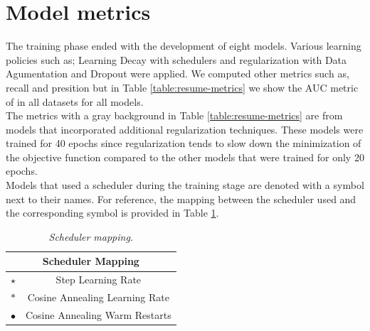\section{Model metrics}

The training phase ended with the development of eight models. Various learning
policies such as; Learning Decay with schedulers and regularization with Data
Agumentation and Dropout were applied. We computed other metrics such as,
recall and presition but in Table \ref{table:resume-metrics} we show the AUC
metric of in all datasets for all models. \\

The metrics with a gray background in Table \ref{table:resume-metrics}
are from models that incorporated additional regularization techniques. These
models were trained for 40 epochs since regularization tends to slow down the
minimization of the objective function compared to the other models that were
trained for only 20 epochs. \\

Models that used a scheduler during the training stage are denoted with a
symbol next to their names. For reference, the mapping between the scheduler
used and the corresponding symbol is provided in Table
\ref{table:scheduler-mapping}.

\begin{table}[H]
  \centering
  \begin{tabular}{cc}
    \toprule
    \multicolumn{2}{c}{\textbf{Scheduler Mapping}} \\
    \midrule
    $\star$     & Step Learning Rate \\
    $\ast$      & Cosine Annealing Learning Rate \\
    $\bullet$   & Cosine Annealing Warm Restarts \\
    \bottomrule
  \end{tabular}
  \caption[Scheduler mapping]
  {\textit{Scheduler mapping.}}
  \label{table:scheduler-mapping}
\end{table}


